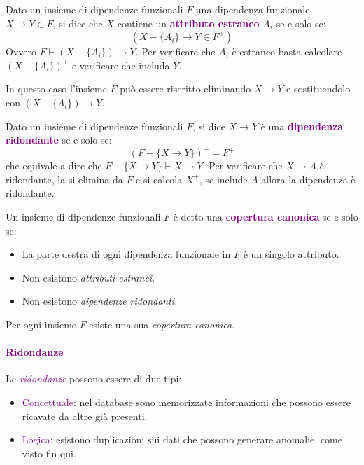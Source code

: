 \begin{definition}
    Dato un insieme di dipendenze funzionali $F$ una dipendenza funzionale
    $X \rightarrow Y \in F$, si dice che $X$ contiene un \textbf{\textcolor{purple}{attributo estraneo}}
    $A_i$ se e solo se:
    \begin{equation*}
        (X - \{A_i\} \rightarrow Y \in F^+)
    \end{equation*}
    Ovvero $F \vdash (X - \{A_i\}) \rightarrow Y$. Per verificare che $A_i$ è estraneo
    basta calcolare $(X - \{A_i\})^+$ e verificare che includa $Y$.

    In questo caso l'insieme $F$ può essere riscritto eliminando $X \rightarrow Y$ e sostituendolo
    con $(X - \{A_i\}) \rightarrow Y$.
\end{definition}

\begin{definition}
    Dato un insieme di dipendenze funzionali $F$, si dice $X \rightarrow Y$ è una \textbf{\textcolor{purple}{dipendenza ridondante}}
    se e solo se:
    \begin{equation*}
        (F - \{X \rightarrow Y\})^+ = F^+
    \end{equation*}
    che equivale a dire che $F - \{X \rightarrow Y\} \vdash X \rightarrow Y$. Per verificare che $X \rightarrow A$ è
    ridondante, la si elimina da $F$ e si calcola $X^+$, se include $A$ allora la dipendenza è ridondante.
\end{definition}

\begin{definition}
    Un insieme di dipendenze funzionali $F$ è detto una \textbf{\textcolor{purple}{copertura canonica}} se e solo se:
    \begin{itemize}
        \item La parte destra di ogni dipendenza funzionale in $F$ è un singolo attributo.
        \item Non esistono \emph{attributi estranei}.
        \item Non esistono \emph{dipendenze ridondanti}.
    \end{itemize}
\end{definition}

\begin{theorem}
    Per ogni insieme $F$ esiste una sua \emph{copertura canonica}.
\end{theorem}

\paragraph{\textcolor{purple}{Ridondanze}} Le \emph{\textcolor{purple}{ridondanze}} possono essere di due tipi:
\begin{itemize}
    \item \textcolor{purple}{Concettuale}: nel database sono memorizzate informazioni che possono essere ricavate
        da altre già presenti.
    \item \textcolor{purple}{Logica}: esistono duplicazioni sui dati che possono generare anomalie, come visto fin qui.
\end{itemize}

